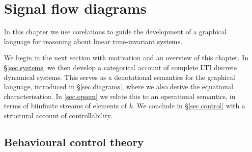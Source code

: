 \chapter{Signal flow diagrams} \label{ch.sigflow}
In this chapter we use corelations to guide the development of a graphical
language for reasoning about linear time-invariant systems. 

%
%

We begin in the next section with motivation and an overview of this
chapter. In \S\ref{sec.systems} we then develop a categorical account of
complete LTI discrete dynamical systems. This serves as a denotational semantics
for the graphical language, introduced in \S\ref{sec.diagrams}, where we also
derive the equational characterisation.  In \textsection\ref{sec.opsem} we
relate this to an operational semantics, in terms of biinfinite streams of
elements of $k$. We conclude in \S\ref{sec.control} with a structural account of
controllability.


\section{Behavioural control theory}

